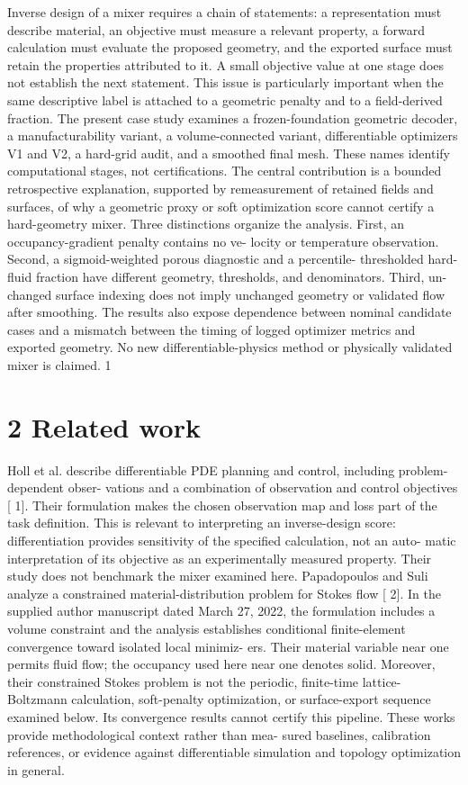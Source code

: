 \documentclass[11pt]{article}
\begin{document}
Inverse design of a mixer requires a chain of statements: a representation must describe material,
an objective must measure a relevant property, a forward calculation must evaluate the proposed
geometry, and the exported surface must retain the properties attributed to it. A small objective
value at one stage does not establish the next statement. This issue is particularly important when
the same descriptive label is attached to a geometric penalty and to a field-derived fraction.
The present case study examines a frozen-foundation geometric decoder, a manufacturability
variant, a volume-connected variant, differentiable optimizers V1 and V2, a hard-grid audit, and a
smoothed final mesh. These names identify computational stages, not certifications. The central
contribution is a bounded retrospective explanation, supported by remeasurement of retained fields
and surfaces, of why a geometric proxy or soft optimization score cannot certify a hard-geometry
mixer.
Three distinctions organize the analysis. First, an occupancy-gradient penalty contains no ve-
locity or temperature observation. Second, a sigmoid-weighted porous diagnostic and a percentile-
thresholded hard-fluid fraction have different geometry, thresholds, and denominators. Third, un-
changed surface indexing does not imply unchanged geometry or validated flow after smoothing.
The results also expose dependence between nominal candidate cases and a mismatch between the
timing of logged optimizer metrics and exported geometry. No new differentiable-physics method
or physically validated mixer is claimed.
1


\section*{2 Related work}

Holl et al. describe differentiable PDE planning and control, including problem-dependent obser-
vations and a combination of observation and control objectives [ 1]. Their formulation makes the
chosen observation map and loss part of the task definition. This is relevant to interpreting an
inverse-design score: differentiation provides sensitivity of the specified calculation, not an auto-
matic interpretation of its objective as an experimentally measured property. Their study does not
benchmark the mixer examined here.
Papadopoulos and Suli analyze a constrained material-distribution problem for Stokes flow [ 2]. In
the supplied author manuscript dated March 27, 2022, the formulation includes a volume constraint
and the analysis establishes conditional finite-element convergence toward isolated local minimiz-
ers. Their material variable near one permits fluid flow; the occupancy used here near one denotes
solid. Moreover, their constrained Stokes problem is not the periodic, finite-time lattice-Boltzmann
calculation, soft-penalty optimization, or surface-export sequence examined below. Its convergence
results cannot certify this pipeline. These works provide methodological context rather than mea-
sured baselines, calibration references, or evidence against differentiable simulation and topology
optimization in general.
\end{document}
